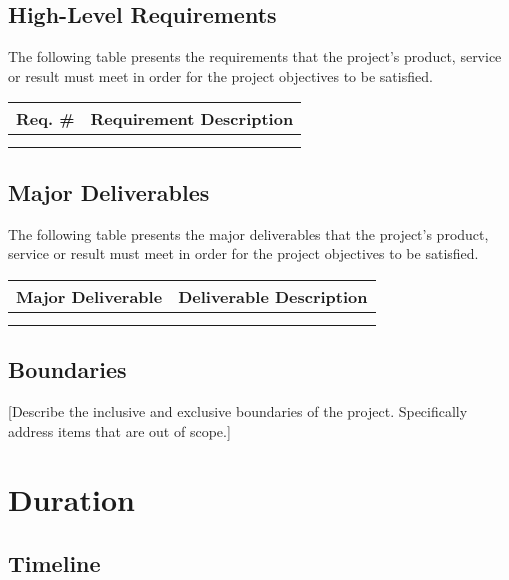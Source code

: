\documentclass[a4paper, 11pt]{article}
\newcommand{\ra}[1]{\renewcommand{\arraystretch}{#1}}
\begin{document}
\hypertarget{high-level-requirements}{%
\subsection{High-Level Requirements}\label{high-level-requirements}}

The following table presents the requirements that the project's
product, service or result must meet in order for the project objectives
to be satisfied.

\ra{1.3}
\begin{longtable}[]{@{}ll@{}}
  \toprule
  \textbf{Req. \#} & \textbf{Requirement Description}\tabularnewline
  \midrule
  \endhead
  &\tabularnewline
  &\tabularnewline
  \bottomrule
\end{longtable}

\hypertarget{major-deliverables}{%
\subsection{Major Deliverables}\label{major-deliverables}}

The following table presents the major deliverables that the project's
product, service or result must meet in order for the project objectives
to be satisfied.

\ra{1.3}
\begin{longtable}[]{@{}ll@{}}
  \toprule
  \textbf{Major Deliverable} & \textbf{Deliverable Description}\tabularnewline
  \midrule
  \endhead
  &\tabularnewline
  &\tabularnewline
  \bottomrule
\end{longtable}

\hypertarget{boundaries}{%
\subsection{Boundaries}\label{boundaries}}

{[}Describe the inclusive and exclusive boundaries of the project.
Specifically address items that are out of scope.{]}

\hypertarget{duration}{%
\section{Duration}\label{duration}}

\hypertarget{timeline}{%
\subsection{Timeline}\label{timeline}}
\end{document}
